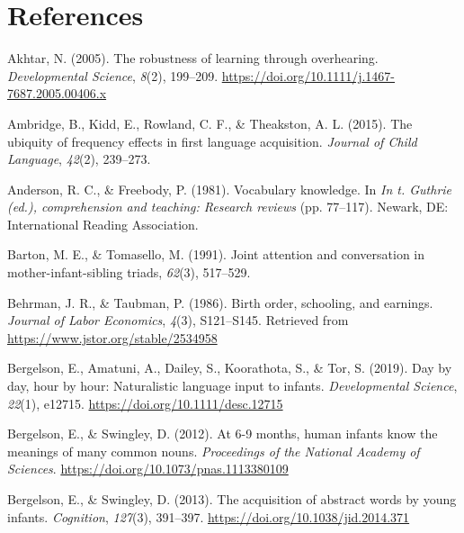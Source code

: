\documentclass[
  english,
  man,floatsintext]{apa6}
\begin{document}
\newpage

\hypertarget{references}{%
\section{References}\label{references}}

\begingroup
\setlength{\parindent}{-0.5in}
\setlength{\leftskip}{0.5in}

\hypertarget{refs}{}
\leavevmode\hypertarget{ref-akhtar_robustness_2005}{}%
Akhtar, N. (2005). The robustness of learning through overhearing. \emph{Developmental Science}, \emph{8}(2), 199--209. \url{https://doi.org/10.1111/j.1467-7687.2005.00406.x}

\leavevmode\hypertarget{ref-ambridge_ubiquity_2015}{}%
Ambridge, B., Kidd, E., Rowland, C. F., \& Theakston, A. L. (2015). The ubiquity of frequency effects in first language acquisition. \emph{Journal of Child Language}, \emph{42}(2), 239--273.

\leavevmode\hypertarget{ref-anderson_vocabulary_1981}{}%
Anderson, R. C., \& Freebody, P. (1981). Vocabulary knowledge. In \emph{In t. Guthrie (ed.), comprehension and teaching: Research reviews} (pp. 77--117). Newark, DE: International Reading Association.

\leavevmode\hypertarget{ref-barton_joint_1991}{}%
Barton, M. E., \& Tomasello, M. (1991). Joint attention and conversation in mother-infant-sibling triads, \emph{62}(3), 517--529.

\leavevmode\hypertarget{ref-behrman_birth_1986}{}%
Behrman, J. R., \& Taubman, P. (1986). Birth order, schooling, and earnings. \emph{Journal of Labor Economics}, \emph{4}(3), S121--S145. Retrieved from \url{https://www.jstor.org/stable/2534958}

\leavevmode\hypertarget{ref-bergelson_day_2019}{}%
Bergelson, E., Amatuni, A., Dailey, S., Koorathota, S., \& Tor, S. (2019). Day by day, hour by hour: Naturalistic language input to infants. \emph{Developmental Science}, \emph{22}(1), e12715. \url{https://doi.org/10.1111/desc.12715}

\leavevmode\hypertarget{ref-bergelson_at_2012}{}%
Bergelson, E., \& Swingley, D. (2012). At 6-9 months, human infants know the meanings of many common nouns. \emph{Proceedings of the National Academy of Sciences}. \url{https://doi.org/10.1073/pnas.1113380109}

\leavevmode\hypertarget{ref-bergelson_acquisition_2013}{}%
Bergelson, E., \& Swingley, D. (2013). The acquisition of abstract words by young infants. \emph{Cognition}, \emph{127}(3), 391--397. \url{https://doi.org/10.1038/jid.2014.371}
\end{document}
